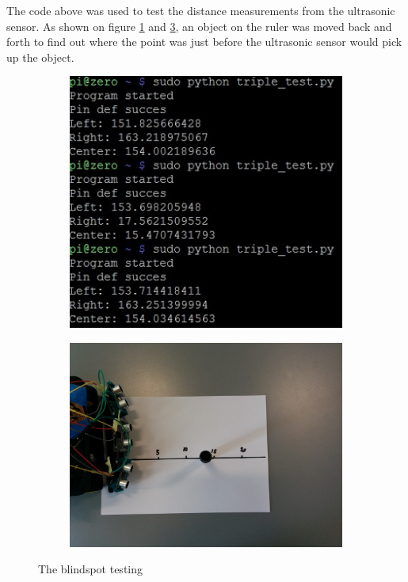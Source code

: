 

The code above was used to test the distance measurements from the ultrasonic sensor. As shown on figure \ref{fig:bs-read} and \ref{fig:bs-test}, an object on the ruler was moved back and forth to find out where the point was just before the ultrasonic sensor would pick up the object.

\begin{figure}[H]
	\centering
	\begin{subfigure}[H]{0.4\textwidth}
		\includegraphics[width=\textwidth]{images/test-blindspotcmd.jpg}
		\label{fig:bs-read}
	\end{subfigure}%
	\quad
	\begin{subfigure}[H]{0.5\textwidth}
		\includegraphics[width=\textwidth]{images/blindspot_test.jpg}
		\label{fig:bs-test}
	\end{subfigure}%
	\quad
	\caption{The blindspot testing}
\end{figure}

